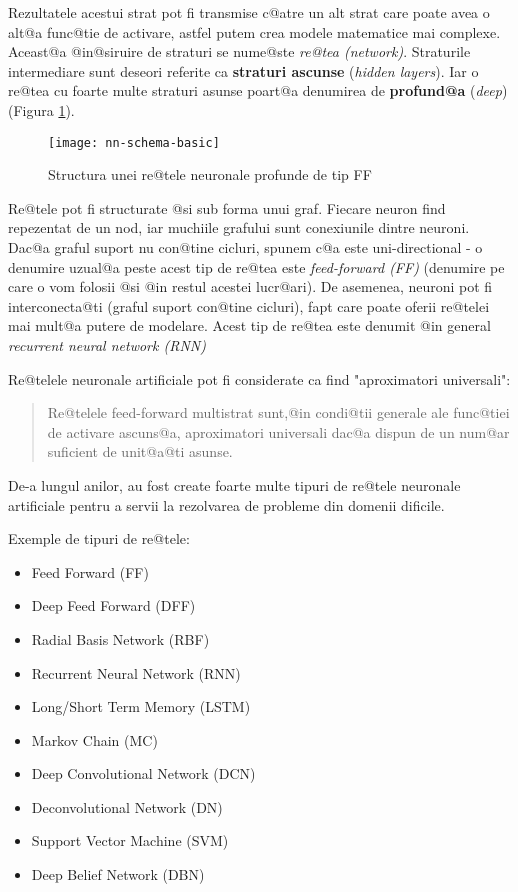 Rezultatele acestui strat pot fi transmise c@atre un alt strat care poate avea o alt@a func@tie de activare, astfel putem crea modele matematice mai complexe. Aceast@a @in@siruire de straturi se nume@ste {\sl re@tea (network)}. Straturile intermediare sunt deseori referite ca \textbf{straturi ascunse} (\textsl{hidden layers}). Iar o re@tea cu foarte multe straturi asunse poart@a denumirea de \textbf{profund@a} (\textsl{deep}) (Figura \ref{nn:schema-basic}).

\begin{figure}[h]
	\centering
	\texttt{[image: nn-schema-basic]}
	\caption{Structura unei re@tele neuronale profunde de tip FF}
	\label{nn:schema-basic}
\end{figure}


Re@tele pot fi structurate @si sub forma unui graf. Fiecare neuron find repezentat de un nod, iar muchiile grafului sunt conexiunile dintre neuroni. Dac@a graful suport nu con@tine cicluri, spunem c@a este uni-directional - o denumire uzual@a peste acest tip de re@tea este {\sl feed-forward (FF)} (denumire pe care o vom folosii @si @in restul acestei lucr@ari). De asemenea, neuroni pot fi interconecta@ti (graful suport con@tine cicluri), fapt care poate oferii re@telei mai mult@a putere de modelare. Acest tip de re@tea este denumit @in general {\sl recurrent neural network (RNN)}

Re@telele neuronale artificiale pot fi considerate ca find "aproximatori universali"\cite{hornik-nn}: 
\begin{quotation}
	Re@telele feed-forward multistrat sunt,@in condi@tii generale ale func@tiei de activare ascuns@a, aproximatori universali dac@a dispun de un num@ar suficient de unit@a@ti asunse.
\end{quotation}

De-a lungul anilor, au fost create foarte multe tipuri de re@tele neuronale artificiale pentru a servii la rezolvarea de probleme din domenii dificile.

Exemple de tipuri de re@tele:

\begin{itemize}
	\item Feed Forward (FF)
	\item Deep Feed Forward (DFF)
	\item Radial Basis Network (RBF)
	\item Recurrent Neural Network (RNN)
	\item Long/Short Term Memory (LSTM)
	\item Markov Chain (MC)
	\item Deep Convolutional Network (DCN)
	\item Deconvolutional Network (DN)
	\item Support Vector Machine (SVM)
	\item Deep Belief Network (DBN)
\end{itemize}



